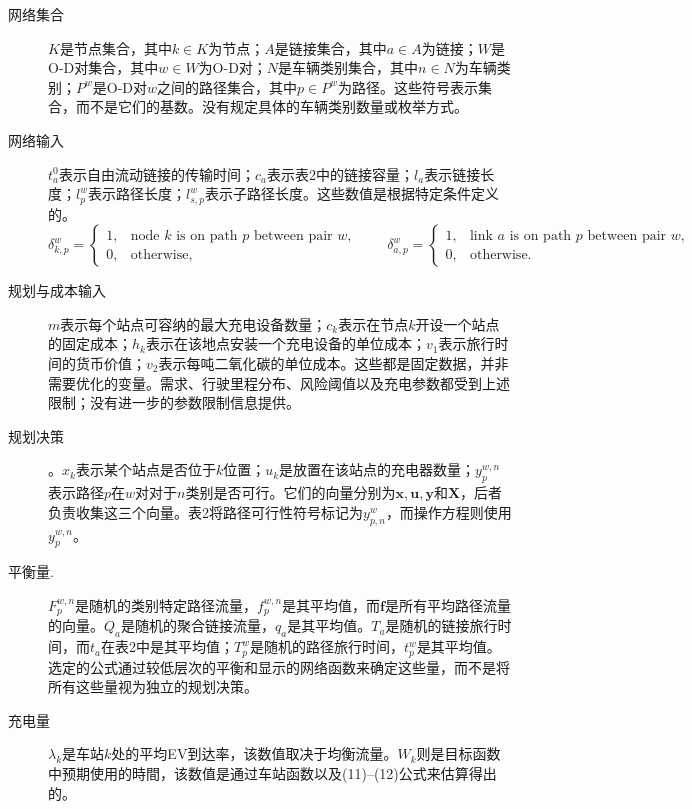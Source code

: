 \documentclass{article}
\begin{document}
\begin{description}
\item[网络集合] $K$是节点集合，其中$k\in K$为节点；$A$是链接集合，其中$a\in A$为链接；$W$是O-D对集合，其中$w\in W$为O-D对；$N$是车辆类别集合，其中$n\in N$为车辆类别；$P^w$是O-D对$w$之间的路径集合，其中$p\in P^w$为路径。这些符号表示集合，而不是它们的基数。没有规定具体的车辆类别数量或枚举方式。
\item[网络输入] $t_a^0$表示自由流动链接的传输时间；$c_a$表示表2中的链接容量；$l_a$表示链接长度；$l_p^w$表示路径长度；$l_{s,p}^w$表示子路径长度。这些数值是根据特定条件定义的。
\[
\delta_{k,p}^w=
\begin{cases}1,&\text{node }k\text{ is on path }p\text{ between pair }w,\\0,&\text{otherwise},\end{cases}
\qquad
\delta_{a,p}^w=
\begin{cases}1,&\text{link }a\text{ is on path }p\text{ between pair }w,\\0,&\text{otherwise}.\end{cases}
\]
\item[规划与成本输入] $m$表示每个站点可容纳的最大充电设备数量；$c_k$表示在节点$k$开设一个站点的固定成本；$h_k$表示在该地点安装一个充电设备的单位成本；$v_1$表示旅行时间的货币价值；$v_2$表示每吨二氧化碳的单位成本。这些都是固定数据，并非需要优化的变量。需求、行驶里程分布、风险阈值以及充电参数都受到上述限制；没有进一步的参数限制信息提供。
\item[规划决策]。$x_k$表示某个站点是否位于$k$位置；$u_k$是放置在该站点的充电器数量；$y_p^{w,n}$表示路径$p$在$w$对对于$n$类别是否可行。它们的向量分别为$\mathbf x,\mathbf u,\mathbf y$和$\mathbf X$，后者负责收集这三个向量。表2将路径可行性符号标记为$y_{p,n}^w$，而操作方程则使用$y_p^{w,n}$。
\item[平衡量.] $F_p^{w,n}$是随机的类别特定路径流量，$f_p^{w,n}$是其平均值，而$\mathbf f$是所有平均路径流量的向量。$Q_a$是随机的聚合链接流量，$q_a$是其平均值。$T_a$是随机的链接旅行时间，而$t_a$在表2中是其平均值；$T_p^w$是随机的路径旅行时间，$t_p^w$是其平均值。选定的公式通过较低层次的平衡和显示的网络函数来确定这些量，而不是将所有这些量视为独立的规划决策。
\item[充电量] $\lambda_k$是车站$k$处的平均EV到达率，该数值取决于均衡流量。$W_k$则是目标函数中预期使用的時間，该数值是通过车站函数以及(11)--(12)公式来估算得出的。
\end{description}
\end{document}
